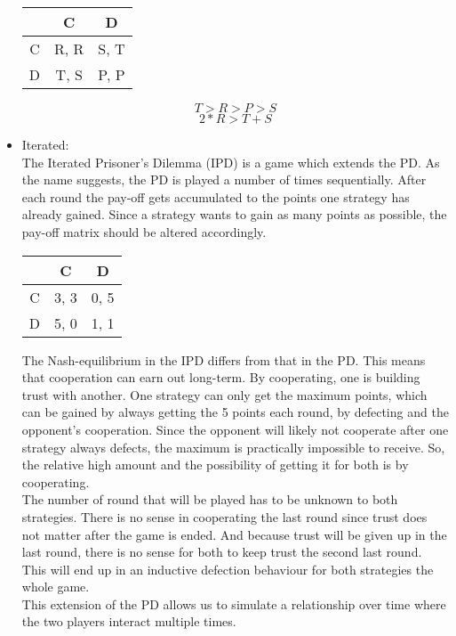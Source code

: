 \documentclass{article}
\begin{document}
\begin{itemize}
\begin{center}
\begin{tabular}{ c|c|c }
   & C & D \\ 
   \hline
 C & R, R & S, T\\  
   \hline
 D & T, S & P, P
\end{tabular}
\end{center}

$$T > R > P > S$$
$$2*R > T + S$$

	\item Iterated:\\
		
The Iterated Prisoner's Dilemma (IPD) is a game which extends the PD. 
As the name suggests, the PD is played a number of times sequentially. 
After each round the pay-off gets accumulated to the points one strategy has already gained. 
Since a strategy wants to gain as many points as possible, the pay-off matrix should be altered accordingly.\\

\begin{center}
\begin{tabular}{ c|c|c }
   & C & D \\ 
   \hline
 C & 3, 3 & 0, 5\\  
   \hline
 D & 5, 0 & 1, 1
\end{tabular}
\end{center}

The Nash-equilibrium in the IPD differs from that in the PD.
This means that cooperation can earn out long-term. 
By cooperating, one is building trust with another. 
One strategy can only get the maximum points, which can be gained by always getting the 5 points each round, by defecting and the opponent's cooperation. 
Since the opponent will likely not cooperate after one strategy always defects, the maximum is practically impossible to receive. 
So, the relative high amount and the possibility of getting it for both is by cooperating.\\
The number of round that will be played has to be unknown to both strategies. 
There is no sense in cooperating the last round since trust does not matter after the game is ended. 
And because trust will be given up in the last round, there is no sense for both to keep trust the second last round. 
This will end up in an inductive defection behaviour for both strategies the whole game.\\
This extension of the PD allows us to simulate a relationship over time where the two players interact multiple times.


\end{itemize}
\end{document}
